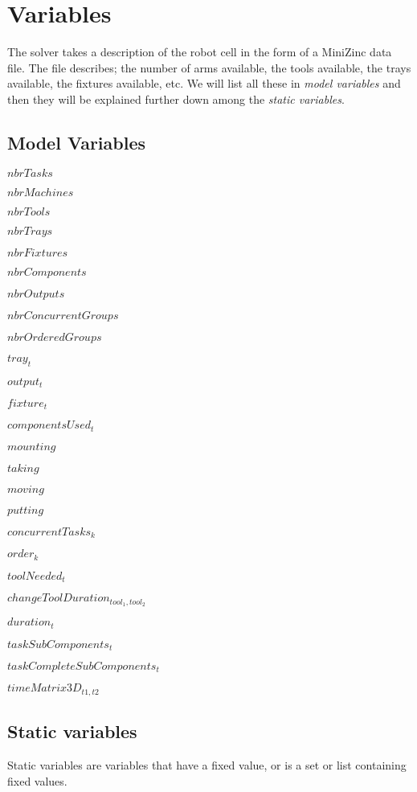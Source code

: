  \section{Variables}
 The solver takes a description of the robot cell in the form of a MiniZinc data file. The file describes; the number of arms available, the tools available, the trays available, the fixtures available, etc. We will list all these in \emph{model variables} and then they will be explained further down among the \emph{static variables}.
 
 \subsection{Model Variables}
\begin{itemize*}
\item $nbrTasks$
\item $nbrMachines$
\item $nbrTools$
\item $nbrTrays$
\item $nbrFixtures$
\item $nbrComponents$
\item $nbrOutputs$
\item $nbrConcurrentGroups$
\item $nbrOrderedGroups$
\item $tray_t$
\item $output_t$
\item $fixture_t$
\item $componentsUsed_t$
\item $mounting$
\item $taking$
\item $moving$
\item $putting$
\item $concurrentTasks_k$
\item $order_k$
\item $toolNeeded_t$
\item $changeToolDuration_{tool_1,tool_2}$
\item $duration_t$
\item $taskSubComponents_t$
\item $taskCompleteSubComponents_t$
\item $timeMatrix3D_{t1,t2}$
\end{itemize*}
 
 \subsection{Static variables}
 Static variables are variables that have a fixed value, or is a set or list containing fixed values.
 

